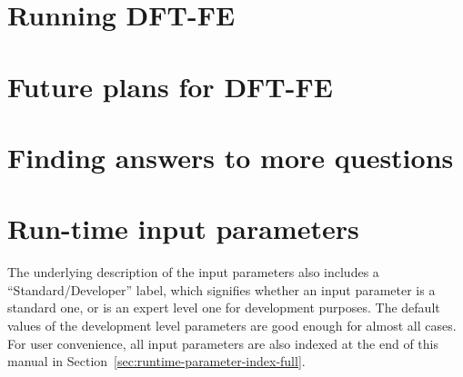 \documentclass{article}
\newcommand{\dftfe}{\textsc{DFT-FE}}
\begin{document}
\section{Running \dftfe}
\label{sec:run}



\section{Future plans for \dftfe}
\label{sec:future}




\section{Finding answers to more questions}
\label{sec:questions-and-answers}



\appendix

\section{Run-time input parameters}
\label{sec:parameters}
The underlying description of the input parameters also includes a ``Standard/Developer'' label, which signifies whether an input parameter is
a standard one, or is an expert level one for development purposes. The default values of the development level parameters are good enough
for almost all cases. For user convenience,
all input parameters are also indexed at the end of this manual in Section~\ref{sec:runtime-parameter-index-full}.



\pagebreak


\let\myRefname\refname
\renewcommand\refname{%
  \addcontentsline{toc}{section}{\numberline{}References}
  \myRefname
}




\pagebreak


\printindex[prmindexfull]
\end{document}
